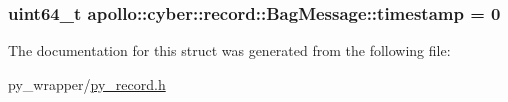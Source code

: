 \hypertarget{structapollo_1_1cyber_1_1record_1_1BagMessage_afe7fffa20a64414ff8a5cf710ce9a06c}{
\subsubsection[{timestamp}]{\setlength{\rightskip}{0pt plus 5cm}uint64\-\_\-t apollo\-::cyber\-::record\-::\-Bag\-Message\-::timestamp = 0}}\label{structapollo_1_1cyber_1_1record_1_1BagMessage_afe7fffa20a64414ff8a5cf710ce9a06c}


The documentation for this struct was generated from the following file\-:\begin{DoxyCompactItemize}
\item 
py\-\_\-wrapper/\hyperlink{py__record_8h}{py\-\_\-record.\-h}\end{DoxyCompactItemize}
